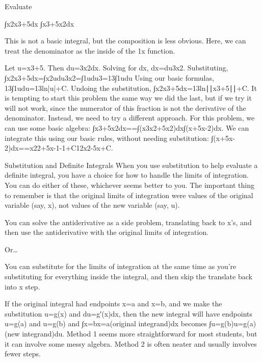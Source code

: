 \begin{example}
Evaluate

∫x2x3+5dx
∫x3+5x2dx

\begin{solution}
  This is not a basic integral, but the composition is less obvious. Here, we can treat the denominator as the inside of the 1x function.

Let u=x3+5. Then du=3x2dx. Solving for dx, dx=du3x2. Substituting,
∫x2x3+5dx=∫x2udu3x2=∫1udu3=13∫1udu
Using our basic formulas,
13∫1udu=13ln|u|+C.
Undoing the substitution,
∫x2x3+5dx=13ln∣∣x3+5∣∣+C.
It is tempting to start this problem the same way we did the last, but if we try it will not work, since the numerator of this fraction is not the derivative of the denominator. Instead, we need to try a different approach. For this problem, we can use some basic algebra:
∫x3+5x2dx==∫(x3x2+5x2)dx∫(x+5x-2)dx.
We can integrate this using our basic rules, without needing substitution:
∫(x+5x-2)dx==x22+5x-1-1+C12x2-5x+C.
\end{solution}\end{example}

Substitution and Definite Integrals
When you use substitution to help evaluate a definite integral, you have a choice for how to handle the limits of integration. You can do either of these, whichever seems better to you. The important thing to remember is that the original limits of integration were values of the original variable (say, x), not values of the new variable (say, u).

You can solve the antiderivative as a side problem, translating back to x’s, and then use the antiderivative with the original limits of integration.

Or…

You can substitute for the limits of integration at the same time as you’re substituting for everything inside the integral, and then skip the translate back into x step.

If the original integral had endpoints x=a and x=b, and we make the substitution u=g(x) and du=g′(x)dx, then the new integral will have endpoints u=g(a) and u=g(b) and
∫x=bx=a(original integrand)dx
becomes
∫u=g(b)u=g(a)(new integrand)du.
Method 1 seems more straightforward for most students, but it can involve some messy algebra. Method 2 is often neater and usually involves fewer steps.

